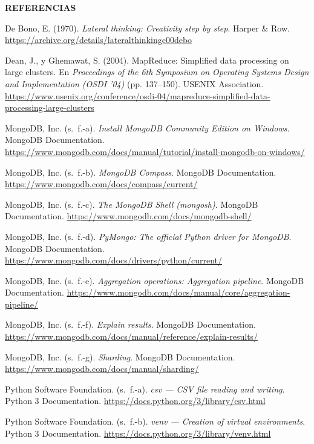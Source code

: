 \documentclass[12pt,a4paper]{article}
\newcommand{\llav}{\symbol{60}\symbol{60}}
\newcommand{\rlav}{\symbol{62}\symbol{62}}
\newcommand{\marcadornospace}[1]{\llav#1\rlav}
\newcommand{\seccionref}{%
  \vspace{0.6cm}%
  {\centering\bfseries\fontsize{12pt}{14pt}\selectfont\marcadornospace{REFERENCIAS}\par}%
  \vspace{0.35cm}%
}
\renewenvironment{thebibliography}[1]{%
  \seccionref
  \begin{list}{}{%
    \setlength{\leftmargin}{1.27cm}%
    \setlength{\itemindent}{-1.27cm}%
    \setlength{\itemsep}{0.75em}%
    \setlength{\parsep}{0pt}%
  }%
  \sloppy
}{%
  \end{list}
}
\begin{document}
\clearpage

\begin{thebibliography}{99}

\item De Bono, E. (1970). \textit{Lateral thinking: Creativity step by step}. Harper \& Row. \url{https://archive.org/details/lateralthinkingc00debo}

\item Dean, J., y Ghemawat, S. (2004). MapReduce: Simplified data processing on large clusters. En \textit{Proceedings of the 6th Symposium on Operating Systems Design and Implementation (OSDI '04)} (pp. 137--150). USENIX Association. \url{https://www.usenix.org/conference/osdi-04/mapreduce-simplified-data-processing-large-clusters}

\item MongoDB, Inc. (s.~f.-a). \textit{Install MongoDB Community Edition on Windows}. MongoDB Documentation. \url{https://www.mongodb.com/docs/manual/tutorial/install-mongodb-on-windows/}

\item MongoDB, Inc. (s.~f.-b). \textit{MongoDB Compass}. MongoDB Documentation. \url{https://www.mongodb.com/docs/compass/current/}

\item MongoDB, Inc. (s.~f.-c). \textit{The MongoDB Shell (mongosh)}. MongoDB Documentation. \url{https://www.mongodb.com/docs/mongodb-shell/}

\item MongoDB, Inc. (s.~f.-d). \textit{PyMongo: The official Python driver for MongoDB}. MongoDB Documentation. \url{https://www.mongodb.com/docs/drivers/python/current/}

\item MongoDB, Inc. (s.~f.-e). \textit{Aggregation operations: Aggregation pipeline}. MongoDB Documentation. \url{https://www.mongodb.com/docs/manual/core/aggregation-pipeline/}

\item MongoDB, Inc. (s.~f.-f). \textit{Explain results}. MongoDB Documentation. \url{https://www.mongodb.com/docs/manual/reference/explain-results/}

\item MongoDB, Inc. (s.~f.-g). \textit{Sharding}. MongoDB Documentation. \url{https://www.mongodb.com/docs/manual/sharding/}

\item Python Software Foundation. (s.~f.-a). \textit{csv --- CSV file reading and writing}. Python 3 Documentation. \url{https://docs.python.org/3/library/csv.html}

\item Python Software Foundation. (s.~f.-b). \textit{venv --- Creation of virtual environments}. Python 3 Documentation. \url{https://docs.python.org/3/library/venv.html}

\end{thebibliography}
\end{document}
